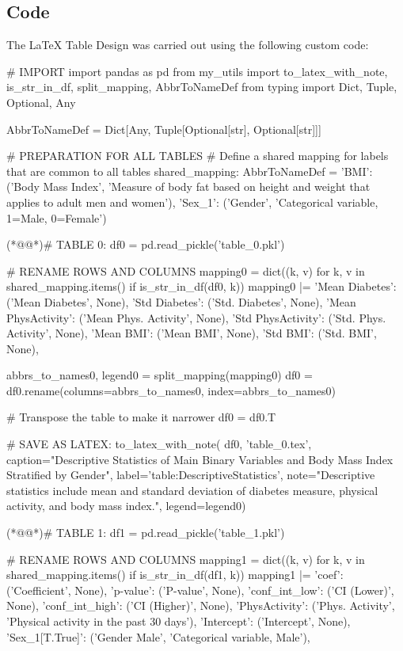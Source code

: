 \documentclass[11pt]{article}
\begin{document}
\subsection{{Code}}
The LaTeX Table Design was carried out using the following custom code:

\begin{python}

# IMPORT
import pandas as pd
from my_utils import to_latex_with_note, is_str_in_df, split_mapping, AbbrToNameDef
from typing import Dict, Tuple, Optional, Any

AbbrToNameDef = Dict[Any, Tuple[Optional[str], Optional[str]]]

# PREPARATION FOR ALL TABLES
# Define a shared mapping for labels that are common to all tables
shared_mapping: AbbrToNameDef = {
    'BMI': ('Body Mass Index', 'Measure of body fat based on height and weight that applies to adult men and women'),
    'Sex_1': ('Gender', 'Categorical variable, 1=Male, 0=Female')
}

(*@@*)# TABLE 0:
df0 = pd.read_pickle('table_0.pkl')

# RENAME ROWS AND COLUMNS
mapping0 = dict((k, v) for k, v in shared_mapping.items() if is_str_in_df(df0, k)) 
mapping0 |= {
    'Mean Diabetes': ('Mean Diabetes', None),
    'Std Diabetes': ('Std. Diabetes', None),
    'Mean PhysActivity': ('Mean Phys. Activity', None),
    'Std PhysActivity': ('Std. Phys. Activity', None),
    'Mean BMI': ('Mean BMI', None),
    'Std BMI': ('Std. BMI', None),
}

abbrs_to_names0, legend0 = split_mapping(mapping0)
df0 = df0.rename(columns=abbrs_to_names0, index=abbrs_to_names0)

# Transpose the table to make it narrower
df0 = df0.T

# SAVE AS LATEX:
to_latex_with_note(
    df0, 'table_0.tex',
    caption="Descriptive Statistics of Main Binary Variables and Body Mass Index Stratified by Gender", 
    label='table:DescriptiveStatistics',
    note="Descriptive statistics include mean and standard deviation of diabetes measure, physical activity, and body mass index.",
    legend=legend0)


(*@@*)# TABLE 1:
df1 = pd.read_pickle('table_1.pkl')

# RENAME ROWS AND COLUMNS
mapping1 = dict((k, v) for k, v in shared_mapping.items() if is_str_in_df(df1, k)) 
mapping1 |= {
    'coef': ('Coefficient', None),
    'p-value': ('P-value', None),
    'conf_int_low': ('CI (Lower)', None),
    'conf_int_high': ('CI (Higher)', None),
    'PhysActivity': ('Phys. Activity', 'Physical activity in the past 30 days'),
    'Intercept': ('Intercept', None),
    'Sex_1[T.True]': ('Gender Male', 'Categorical variable, Male'),
}


\end{python}
\end{document}
